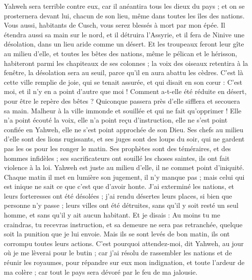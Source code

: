 \begin{multicols}{2}
Yahweh sera terrible contre eux, car il anéantira tous les dieux du pays ; et on se prosternera devant lui, chacun de son lieu, même dans toutes les îles des nations.
Vous aussi, habitants de Cusch, vous serez blessés à mort par mon épée.
Il étendra aussi sa main sur le nord, et il détruira l'Assyrie, et il fera de Ninive une désolation, dans un lieu aride comme un désert.
Et les troupeaux feront leur gîte au milieu d'elle, et toutes les bêtes des nations, même le pélican et le hérisson, habiteront parmi les chapiteaux de ses colonnes ; la voix des oiseaux retentira à la fenêtre, la désolation sera au seuil, parce qu'il en aura abattu les cèdres.
C'est là cette ville remplie de joie, qui se tenait assurée, et qui disait en son cœur : C'est moi, et il n'y en a point d'autre que moi ! Comment a-t-elle été réduite en désert, pour être le repère des bêtes ? Quiconque passera près d'elle sifflera et secouera sa main.
\VerseOne{}Malheur à la ville immonde et souillée et qui ne fait qu'opprimer !
Elle n'a point écouté la voix, elle n'a point reçu d'instruction, elle ne s'est point confiée en Yahweh, elle ne s'est point approchée de son Dieu.
Ses chefs au milieu d'elle sont des lions rugissants, et ses juges sont des loups du soir, qui ne gardent pas les os pour les ronger le matin.
Ses prophètes sont des téméraires, et des hommes infidèles ; ses sacrificateurs ont souillé les choses saintes, ils ont fait violence à la loi.
Yahweh est juste au milieu d'elle, il ne commet point d'iniquité. Chaque matin il met en lumière son jugement, il n'y manque pas ; mais celui qui est inique ne sait ce que c'est que d'avoir honte.
J'ai exterminé les nations, et leurs forteresses ont été désolées ; j'ai rendu désertes leurs places, si bien que personne n'y passe ; leurs villes ont été détruites, sans qu'il y soit resté un seul homme, et sans qu'il y ait aucun habitant.
Et je disais : Au moins tu me craindras, tu recevras instruction, et sa demeure ne sera pas retranchée, quelque soit la punition que je lui envoie. Mais ils se sont levés de bon matin, ils ont corrompu toutes leurs actions.
C'est pourquoi attendez-moi, dit Yahweh, au jour où je me lèverai pour le butin ; car j'ai résolu de rassembler les nations et de réunir les royaumes, pour répandre sur eux mon indignation, et toute l'ardeur de ma colère ; car tout le pays sera dévoré par le feu de ma jalousie.

\end{multicols}
